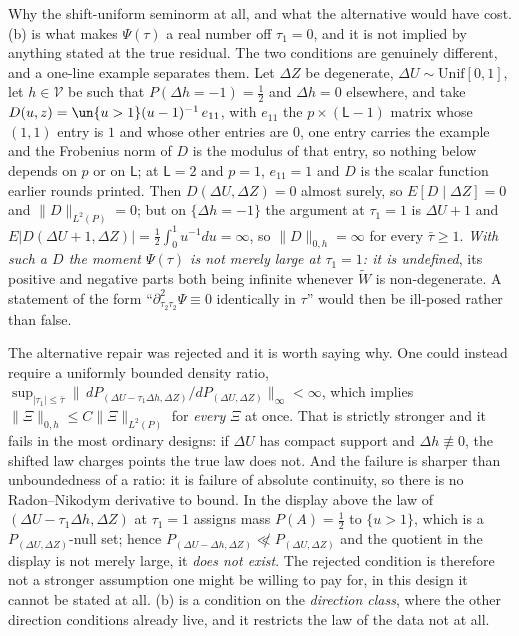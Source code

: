 \begin{remark}
Why the shift-uniform seminorm at all, and what the alternative would have
cost.\label{rem:shiftclass}
(b) is what makes $\Psi(\tau)$ a real number off $\tau_1=0$, and it is not
implied by anything stated at the true residual. The two conditions are genuinely different, and a
one-line example separates them. Let $\Delta Z$ be degenerate, $\Delta U\sim\mathrm{Unif}[0,1]$, let
$h\in\mathcal V$ be such that $P(\Delta h=-1)=\tfrac12$ and $\Delta h=0$ elsewhere,
and take $D(u,z)=\un\{u>1\}(u-1)^{-1}\,e_{11}$, with $e_{11}$ the $p\times(\mathsf L-1)$ matrix whose
$(1,1)$ entry is $1$ and whose other entries are $0$, one entry carries the example and the
Frobenius norm of $D$ is the modulus of that entry, so nothing below depends on $p$ or on $\mathsf L$;
at $\mathsf L=2$ and $p=1$, $e_{11}=1$ and $D$ is the scalar function earlier rounds printed. Then
$D(\Delta U,\Delta Z)=0$ almost surely, so
$E[D\mid\Delta Z]=0$ and $\|D\|_{L^{2}(P)}=0$; but on $\{\Delta h=-1\}$ the argument at $\tau_1=1$ is
$\Delta U+1$ and
$E|D(\Delta U+1,\Delta Z)|=\tfrac12\int_0^1u^{-1}du=\infty$, so $\|D\|_{0,h}=\infty$ for every
$\bar\tau\ge1$. \emph{With such a $D$ the moment $\Psi(\tau)$ is not merely large at $\tau_1=1$: it is
undefined}, its positive and negative parts both being infinite whenever $\widetilde W$ is
non-degenerate. A statement of the form ``$\partial^{2}_{\tau_2\tau_2}\Psi\equiv0$ identically in
$\tau$'' would then be ill-posed rather than false.

The alternative repair was rejected and it is worth saying why. One could instead require a
uniformly bounded density ratio,
$\sup_{|\tau_1|\le\bar\tau}\big\|\,dP_{(\Delta U-\tau_1\Delta h,\Delta Z)}/dP_{(\Delta U,\Delta Z)}\big\|_\infty<\infty$,
which implies $\|\Xi\|_{0,h}\le C\|\Xi\|_{L^{2}(P)}$ for \emph{every} $\Xi$ at once. That is strictly
stronger and it fails in the most ordinary designs: if $\Delta U$ has compact support and
$\Delta h\not\equiv0$, the shifted law charges points the true law does not. And the failure is
sharper than unboundedness of a ratio: it is failure of absolute continuity, so there is no
Radon--Nikodym derivative to bound. In the display above the law of
$(\Delta U-\tau_1\Delta h,\Delta Z)$ at $\tau_1=1$ assigns mass $P(A)=\tfrac12$ to $\{u>1\}$, which is a
$P_{(\Delta U,\Delta Z)}$-null set; hence
$P_{(\Delta U-\Delta h,\Delta Z)}\not\ll P_{(\Delta U,\Delta Z)}$ and the quotient in the display is not
merely large, it \emph{does not exist}. The rejected condition is therefore not a stronger assumption one
might be willing to pay for, in this design it cannot be stated at all. (b) is a condition on the
\emph{direction class}, where the other direction conditions already live, and it restricts the law of
the data not at all.
\end{remark}

